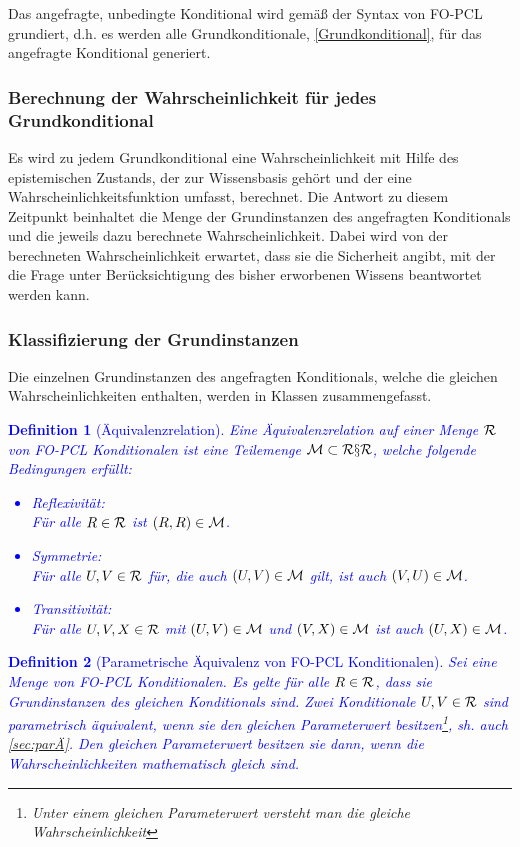 \documentclass[a4paper, 11pt]{book}
\newtheorem{Def}{Definition }[section]
\begin{document}
Das angefragte, unbedingte Konditional wird gemäß der Syntax von FO-PCL grundiert, d.h. es werden alle Grundkonditionale, \ref{Grundkonditional},  für das angefragte Konditional generiert.

\subsubsection{Berechnung der Wahrscheinlichkeit für jedes Grundkonditional}
Es wird zu jedem Grundkonditional eine Wahrscheinlichkeit mit Hilfe des epistemischen Zustands, der zur Wissensbasis gehört und der eine Wahrscheinlichkeitsfunktion umfasst, berechnet. Die Antwort zu diesem Zeitpunkt beinhaltet die Menge der Grundinstanzen des angefragten Konditionals und die jeweils dazu berechnete Wahrscheinlichkeit. Dabei wird von der berechneten Wahrscheinlichkeit erwartet, dass sie die Sicherheit angibt, mit der die Frage unter Berücksichtigung des bisher erworbenen Wissens beantwortet werden kann.
	
\subsubsection{Klassifizierung der Grundinstanzen} 
Die einzelnen Grundinstanzen des angefragten Konditionals, welche die gleichen Wahrscheinlichkeiten enthalten, werden in Klassen zusammengefasst.
\textcolor{blue}{
\begin{Def}[Äquivalenzrelation] \label{Äquivalenzrelation}
Eine Äquivalenzrelation auf einer Menge $ \cal{R} $ von FO-PCL Konditionalen ist eine Teilemenge $ \cal{M} \subset \cal{R} x \cal{R}$, welche folgende Bedingungen erfüllt:\\
\begin{itemize}
	\item Reflexivität:\\
	 Für alle $ R \in \cal{R} $ ist $ (R,R) \in \cal{M} $.
	\item Symmetrie: \\
	Für alle $ U,V \in \cal{R} $ für, die auch  $ (U,V) \in \cal{M} $ gilt, ist auch  $ (V,U) \in \cal{M} $.
	\item  Transitivität:\\
	Für alle $ U,V,X  \in \cal{R} $ mit $ (U,V) \in \cal{M} $ und $ (V,X) \in \cal{M} $ ist auch $ (U,X) \in \cal{M} $.
\end{itemize}
\end{Def}
}


\textcolor{blue}{
\begin{Def}[Parametrische Äquivalenz von FO-PCL Konditionalen] \label{Äquivalenz in FO-PCL}  
	Sei  eine Menge von FO-PCL Konditionalen. Es gelte für alle $ R \in \cal{R} $, dass sie Grundinstanzen des gleichen Konditionals sind. Zwei Konditionale $ U,V \in \cal{R} $ sind parametrisch äquivalent, wenn sie den gleichen Parameterwert besitzen\footnote{Unter einem gleichen Parameterwert versteht man die gleiche Wahrscheinlichkeit}, sh. auch \ref{sec:parÄ}. Den gleichen Parameterwert besitzen sie dann, wenn die Wahrscheinlichkeiten mathematisch gleich sind. 
\end{Def}
}
\end{document}
